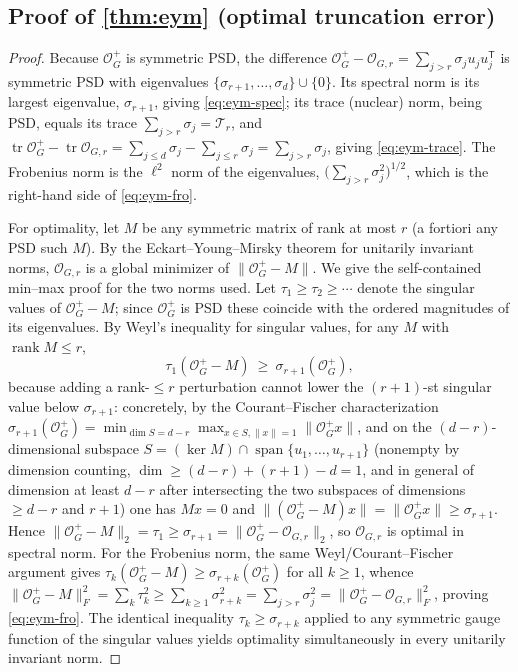 \documentclass[aps,prxquantum,reprint,amsmath,amssymb,floatfix,nofootinbib,superscriptaddress,longbibliography]{revtex4-2}
\theoremstyle{remark}
\newcommand{\calO}{\mathcal{O}}
\begin{document}
\subsection{Proof of \texorpdfstring{\cref{thm:eym}}{Theorem 1} (optimal
truncation error)}
\label{app:eym}

\begin{proof}
Because \(\calO_G^{+}\) is symmetric PSD, the difference
\(\calO_G^{+}-\calO_{G,r}=\sum_{j>r}\sigma_j u_ju_j^{\mathsf T}\) is symmetric PSD
with eigenvalues \(\{\sigma_{r+1},\dots,\sigma_d\}\cup\{0\}\).  Its spectral norm
is its largest eigenvalue, \(\sigma_{r+1}\), giving \cref{eq:eym-spec}; its trace
(nuclear) norm, being PSD, equals its trace \(\sum_{j>r}\sigma_j=\mathcal T_r\),
and \(\operatorname{tr}\calO_G^{+}-\operatorname{tr}\calO_{G,r}=\sum_{j\le d}
\sigma_j-\sum_{j\le r}\sigma_j=\sum_{j>r}\sigma_j\), giving \cref{eq:eym-trace}.
The Frobenius norm is the \(\ell^2\) norm of the eigenvalues,
\(\bigl(\sum_{j>r}\sigma_j^2\bigr)^{1/2}\), which is the right-hand side of
\cref{eq:eym-fro}.

For optimality, let \(M\) be any symmetric matrix of rank at most \(r\)
(a fortiori any PSD such \(M\)).  By the Eckart--Young--Mirsky theorem for
unitarily invariant norms, \(\calO_{G,r}\) is a global minimizer of
\(\|\calO_G^{+}-M\|\).  We give the self-contained min--max proof for the two
norms used.  Let \(\tau_1\ge\tau_2\ge\cdots\) denote the singular values of
\(\calO_G^{+}-M\); since \(\calO_G^{+}\) is PSD these coincide with the ordered
magnitudes of its eigenvalues.  By Weyl's inequality for singular values,
for any \(M\) with \(\operatorname{rank}M\le r\),
\[
    \tau_{1}(\calO_G^{+}-M)\ \ge\ \sigma_{r+1}(\calO_G^{+}),
\]
because adding a rank-\(\le r\) perturbation cannot lower the
\((r+1)\)-st singular value below \(\sigma_{r+1}\): concretely, by the
Courant--Fischer characterization
\(\sigma_{r+1}(\calO_G^{+})=\min_{\dim S=d-r}\max_{x\in S,\|x\|=1}
\|\calO_G^{+}x\|\), and on the \((d-r)\)-dimensional subspace
\(S=(\ker M)\cap\operatorname{span}\{u_1,\dots,u_{r+1}\}\) (nonempty by
dimension counting, \(\dim\ge (d-r)+(r+1)-d=1\), and in general of dimension at
least \(d-r\) after intersecting the two subspaces of dimensions \(\ge d-r\) and
\(r+1\)) one has \(Mx=0\) and \(\|(\calO_G^{+}-M)x\|=\|\calO_G^{+}x\|\ge
\sigma_{r+1}\).  Hence \(\|\calO_G^{+}-M\|_2=\tau_1\ge\sigma_{r+1}
=\|\calO_G^{+}-\calO_{G,r}\|_2\), so \(\calO_{G,r}\) is optimal in spectral norm.
For the Frobenius norm, the same Weyl/Courant--Fischer argument gives
\(\tau_k(\calO_G^{+}-M)\ge\sigma_{r+k}(\calO_G^{+})\) for all \(k\ge1\), whence
\(\|\calO_G^{+}-M\|_F^2=\sum_k\tau_k^2\ge\sum_{k\ge1}\sigma_{r+k}^2
=\sum_{j>r}\sigma_j^2=\|\calO_G^{+}-\calO_{G,r}\|_F^2\), proving
\cref{eq:eym-fro}.  The identical inequality \(\tau_k\ge\sigma_{r+k}\) applied to
any symmetric gauge function of the singular values yields optimality
simultaneously in every unitarily invariant norm.


\end{proof}
\end{document}
